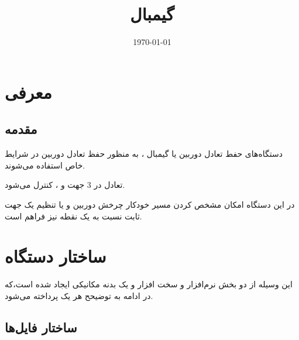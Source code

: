 \documentclass[a4paper,12pt]{report}
\begin{document}

	\rand
	\title{
		{\vspace*{-5cm}
			\centering\quad\FS {}
		}\\[4cm]
		\XBT
		گیمبال
	}

	\date{
		\XBT
		\today
	}

	\maketitle
	\setcounter{page}{1}
	\tableofcontents
	\listoffigures

	\newpage

	\chapter{
	معرفی
	}\label{chap1}
	\rand
	\section{
	مقدمه
	}\label{sec1:chap1}

	دستگاه‌های حفط تعادل دوربین یا گیمبال
	، به منظور حفظ تعادل دوربین در شرایط خاص استفاده می‌شوند.

	تعادل در 3 جهت
	 و ، 
	کنترل می‌شود.

	در این دستگاه امکان مشخص کردن مسیر خودکار چرخش دوربین و یا تنظیم یک جهت ثابت نسبت به یک نقطه نیز فراهم است.

	\chapter{
		ساختار دستگاه
	}\label{chap2}
	این وسیله از دو بخش نرم‌افزار و سخت افزار و یک بدنه مکانیکی ایجاد شده است،‌که در ادامه به توضیحح هر یک پرداخته می‌شود.
	\section{ساختار فایل‌ها}\label{sec1:chap2}
\end{document}
